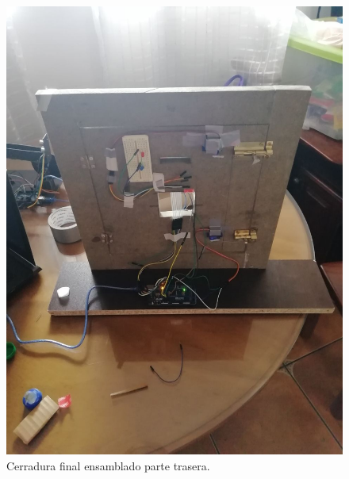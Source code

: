 \begin{figure}[H]
    \centering
    \includegraphics[width=.55\linewidth]{Img/FinalTrasero.jpeg}
    \caption{Cerradura final ensamblado parte trasera.}
\end{figure}




\newpage